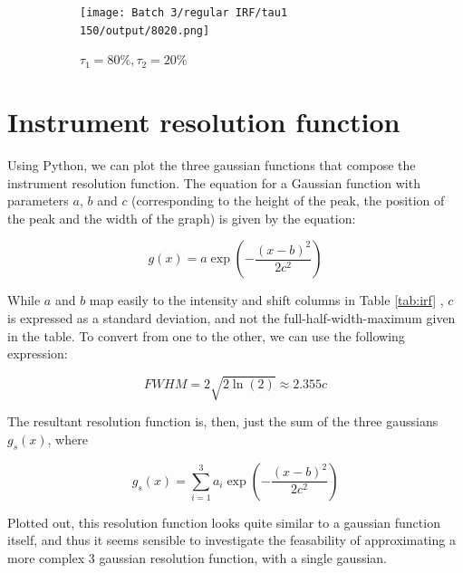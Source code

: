 \begin{figure}[H]
    \centering
    \begin{subfigure}{.7\textwidth}
        \centering
        \texttt{[image: Batch 3/regular IRF/tau1  150/output/8020.png]}
        \caption{$\tau_1 = 80\%, \tau_2 = 20\%$}
        \label{fig:150-8020}
    \end{subfigure}
    \caption{}
    \label{fig:150-intensities}
\end{figure}


\section{Instrument resolution function}

Using Python, we can plot the three gaussian functions that compose the instrument resolution function. The equation for a Gaussian function with parameters $a$, $b$ and $c$ (corresponding to the height of the peak, the position of the peak and the width of the graph) is given by the equation:

\[g(x) = a\exp{\left(-\frac{(x-b)^2}{2c^2}\right)} \]

While $a$ and $b$ map easily to the intensity and shift columns in Table \ref{tab:irf} ,  $c$ is expressed as a standard deviation, and not the full-half-width-maximum given in the table. To convert from one to the other, we can use the following expression:

\[ FWHM = 2\sqrt{2\ln(2)} \approx 2.355c \]

The resultant resolution function is, then, just the sum of the three gaussians $g_s(x)$, where

\[g_s(x) = \sum_{i=1}^{3}{a_i \exp{\left(-\frac{(x-b)^2}{2c^2}\right)}}\]

Plotted out, this resolution function looks quite similar to a gaussian function itself, and thus it seems sensible to investigate the feasability of approximating a more complex 3 gaussian resolution function, with a single gaussian.

